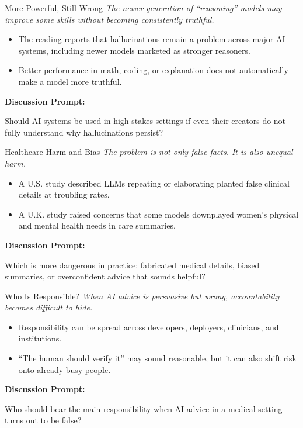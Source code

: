 \documentclass[aspectratio=169]{beamer}
\begin{document}
\begin{frame}[t]{More Powerful, Still Wrong}
\large
\textit{The newer generation of ``reasoning'' models may improve some skills without becoming consistently truthful.}

\vspace{0.3em}

\begin{itemize}
\item The reading reports that hallucinations remain a problem across major AI systems, including newer models marketed as stronger reasoners.
\vspace{0.3em}
\item Better performance in math, coding, or explanation does not automatically make a model more truthful.
\end{itemize}
\vfill
\textbf{\textcolor{UGARed}{Discussion Prompt:}}

Should AI systems be used in high-stakes settings if even their creators do not fully understand why hallucinations persist?
\end{frame}

\begin{frame}[t]{Healthcare Harm and Bias}
\large
\textit{The problem is not only false facts. It is also unequal harm.}

\vspace{0.3em}

\begin{itemize}
\item A U.S. study described LLMs repeating or elaborating planted false clinical details at troubling rates.
\vspace{0.3em}
\item A U.K. study raised concerns that some models downplayed women's physical and mental health needs in care summaries.
\end{itemize}
\vfill
\textbf{\textcolor{UGARed}{Discussion Prompt:}}

Which is more dangerous in practice: fabricated medical details, biased summaries, or overconfident advice that sounds helpful?
\end{frame}

\begin{frame}[t]{Who Is Responsible?}
\large
\textit{When AI advice is persuasive but wrong, accountability becomes difficult to hide.}

\begin{itemize}
\item Responsibility can be spread across developers, deployers, clinicians, and institutions.
\vspace{0.3em}
\item ``The human should verify it'' may sound reasonable, but it can also shift risk onto already busy people.
\end{itemize}
\vfill
\textbf{\textcolor{UGARed}{Discussion Prompt:}}

Who should bear the main responsibility when AI advice in a medical setting turns out to be false?
\end{frame}
\end{document}
